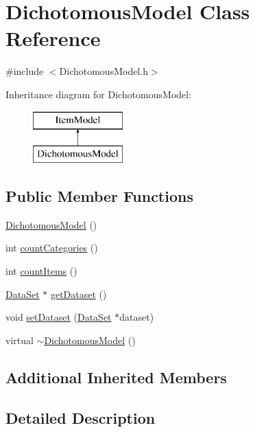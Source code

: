 \hypertarget{classDichotomousModel}{}\section{Dichotomous\+Model Class Reference}
\label{classDichotomousModel}


{\ttfamily \#include $<$Dichotomous\+Model.\+h$>$}

Inheritance diagram for Dichotomous\+Model\+:\begin{figure}[H]
\begin{center}
\leavevmode
\includegraphics[height=2.000000cm]{classDichotomousModel}
\end{center}
\end{figure}
\subsection*{Public Member Functions}
\begin{DoxyCompactItemize}
\item 
\hyperlink{classDichotomousModel_a0938ae1266fcd8d72e78b14c55e5e214}{Dichotomous\+Model} ()
\item 
int \hyperlink{classDichotomousModel_a6861f3ef96b4525ba1b1db1a7dfb1ca3}{count\+Categories} ()
\item 
int \hyperlink{classDichotomousModel_ae9dfca33b3549ea73e4fc8fcab204cc0}{count\+Items} ()
\item 
\hyperlink{classDataSet}{Data\+Set} $\ast$ \hyperlink{classDichotomousModel_a0fd6d3ed3a6e78f7a65caa9d2828c7c6}{get\+Dataset} ()
\item 
void \hyperlink{classDichotomousModel_a5e7bf92bc598e581477b9c5814ca7f72}{set\+Dataset} (\hyperlink{classDataSet}{Data\+Set} $\ast$dataset)
\item 
virtual \hyperlink{classDichotomousModel_ae7500fc776e29cad3f2a6675f83ae22f}{$\sim$\+Dichotomous\+Model} ()
\end{DoxyCompactItemize}
\subsection*{Additional Inherited Members}


\subsection{Detailed Description}


